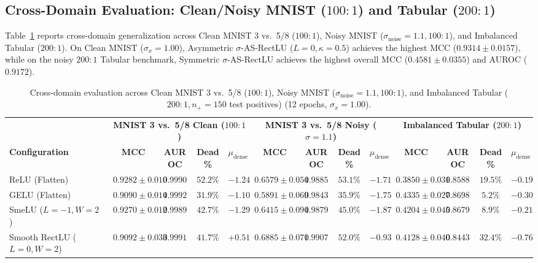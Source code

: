 \documentclass[10pt,a4paper]{article}
\begin{document}
\subsection{Cross-Domain Evaluation: Clean/Noisy MNIST ($100:1$) and Tabular ($200:1$)}
Table~\ref{tab:cross_domain} reports cross-domain generalization across Clean MNIST 3 vs.\ 5/8 ($100:1$), Noisy MNIST ($\sigma_{\text{noise}}=1.1, 100:1$), and Imbalanced Tabular ($200:1$). On Clean MNIST ($\sigma_x=1.00$), Asymmetric $\sigma$-AS-RectLU ($L=0, \kappa=0.5$) achieves the highest MCC ($0.9314 \pm 0.0157$), while on the noisy $200:1$ Tabular benchmark, Symmetric $\sigma$-AS-RectLU achieves the highest overall MCC ($0.4581 \pm 0.0355$) and AUROC ($0.9172$).

\begin{table}[t]
\centering
\caption{Cross-domain evaluation across Clean MNIST 3 vs.\ 5/8 ($100:1$), Noisy MNIST ($\sigma_{\text{noise}}=1.1, 100:1$), and Imbalanced Tabular ($200:1, n_+=150$ test positives) (12 epochs, $\sigma_x=1.00$).}
\label{tab:cross_domain}
\footnotesize
\setlength{\tabcolsep}{3.4pt}
\renewcommand{\arraystretch}{1.05}
\begin{tabular}{lcccccccccccc}
\toprule
& \multicolumn{4}{c}{\textbf{MNIST 3 vs.\ 5/8 Clean ($100:1$)}} & \multicolumn{4}{c}{\textbf{MNIST 3 vs.\ 5/8 Noisy ($\sigma=1.1$)}} & \multicolumn{4}{c}{\textbf{Imbalanced Tabular ($200:1$)}} \\
\cmidrule(lr){2-5} \cmidrule(lr){6-9} \cmidrule(lr){10-13}
\textbf{Configuration} & \textbf{MCC} & \textbf{AUROC} & \textbf{Dead\%} & $\mu_{\text{dense}}$ & \textbf{MCC} & \textbf{AUROC} & \textbf{Dead\%} & $\mu_{\text{dense}}$ & \textbf{MCC} & \textbf{AUROC} & \textbf{Dead\%} & $\mu_{\text{dense}}$ \\
\midrule
ReLU (Flatten) & $0.9282 \pm 0.010$ & $0.9990$ & $52.2\%$ & $-1.24$ & $0.6579 \pm 0.054$ & $0.9885$ & $53.1\%$ & $-1.71$ & $0.3850 \pm 0.031$ & $0.8588$ & $19.5\%$ & $-0.19$ \\
GELU (Flatten) & $0.9090 \pm 0.014$ & $0.9992$ & $31.9\%$ & $-1.10$ & $0.5891 \pm 0.069$ & $0.9843$ & $35.9\%$ & $-1.75$ & $0.4335 \pm 0.027$ & $0.8698$ & $5.2\%$ & $-0.30$ \\
SmeLU ($L=-1, W=2$)~\cite{shamir2020} & $0.9270 \pm 0.012$ & $0.9989$ & $42.7\%$ & $-1.29$ & $0.6415 \pm 0.094$ & $0.9879$ & $45.0\%$ & $-1.87$ & $0.4204 \pm 0.045$ & $0.8679$ & $8.9\%$ & $-0.21$ \\
Smooth RectLU ($L=0, W=2$) & $0.9092 \pm 0.033$ & $0.9991$ & $41.7\%$ & $+0.51$ & $0.6885 \pm 0.071$ & $0.9907$ & $52.0\%$ & $-0.93$ & $0.4128 \pm 0.040$ & $0.8443$ & $32.4\%$ & $-0.76$ \\

\end{tabular}
\end{table}
\end{document}
